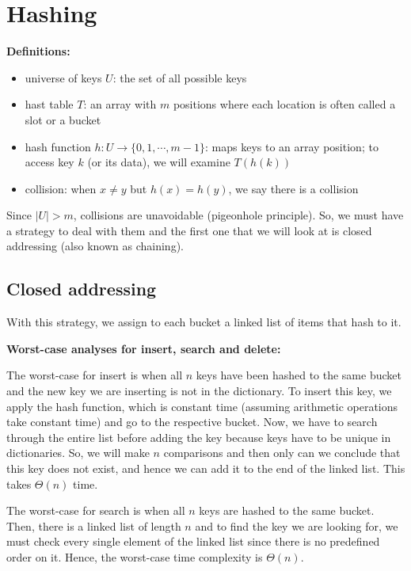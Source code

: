 \documentclass[11pt]{article}
\begin{document}
\newpage 
\section{Hashing}

\textbf{Definitions:}
\begin{itemize}
    \item universe of keys $U$: the set of all possible keys
    \item hast table $T$: an array with $m$ positions where each location is often called a slot or a bucket 
    \item hash function $h: U \to \{0,1, \cdots, m-1\}$: maps keys to an array position; to access key $k$ (or its data), we will examine $T(h(k))$
    \item collision: when $x \neq y$ but $h(x) = h(y)$, we say there is a collision
\end{itemize}
Since $|U| > m$, collisions are unavoidable (pigeonhole principle). So, we must have a strategy to deal with them and the first one that we will look at is closed addressing (also known as chaining). 

\subsection{Closed addressing}
With this strategy, we assign to each bucket a linked list of items that hash to it.

\textbf{Worst-case analyses for insert, search and delete:}

The worst-case for insert is when all $n$ keys have been hashed to the same bucket and the new key we are inserting is not in the dictionary. To insert this key, we apply the hash function, which is constant time (assuming arithmetic operations take constant time) and go to the respective bucket. Now, we have to search through the entire list before adding the key because keys have to be unique in dictionaries. So, we will make $n$ comparisons and then only can we conclude that this key does not exist, and hence we can add it to the end of the linked list. This takes $\Theta(n)$ time. 

The worst-case for search is when all $n$ keys are hashed to the same bucket. Then, there is a linked list of length $n$ and to find the key we are looking for, we must check every single element of the linked list since there is no predefined order on it. Hence, the worst-case time complexity is $\Theta(n)$. 
\end{document}
